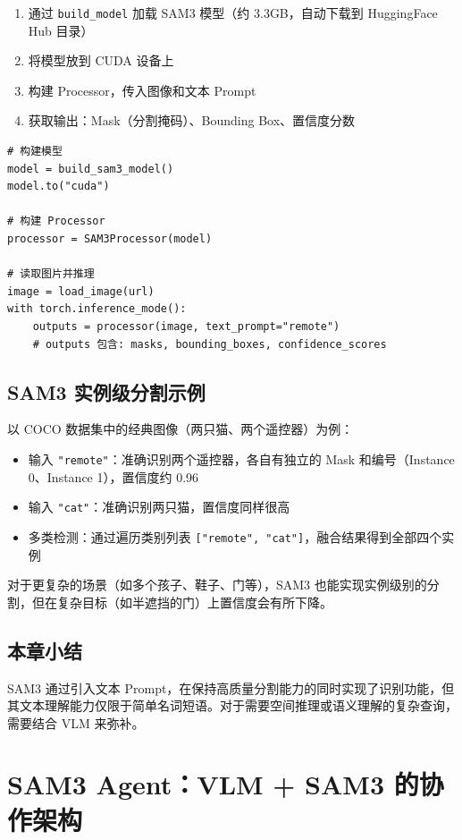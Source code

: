 \documentclass[a4paper]{article}
\begin{document}
\begin{enumerate}
    \item 通过 \texttt{build\_model} 加载 SAM3 模型（约 3.3GB，自动下载到 HuggingFace Hub 目录）
    \item 将模型放到 CUDA 设备上
    \item 构建 Processor，传入图像和文本 Prompt
    \item 获取输出：Mask（分割掩码）、Bounding Box、置信度分数
\end{enumerate}

\begin{lstlisting}[caption={SAM3 基本使用示例（伪代码）}]
# 构建模型
model = build_sam3_model()
model.to("cuda")

# 构建 Processor
processor = SAM3Processor(model)

# 读取图片并推理
image = load_image(url)
with torch.inference_mode():
    outputs = processor(image, text_prompt="remote")
    # outputs 包含: masks, bounding_boxes, confidence_scores
\end{lstlisting}

\subsection{SAM3 实例级分割示例}

以 COCO 数据集中的经典图像（两只猫、两个遥控器）为例：

\begin{itemize}
    \item 输入 \texttt{"remote"}：准确识别两个遥控器，各自有独立的 Mask 和编号（Instance 0、Instance 1），置信度约 0.96
    \item 输入 \texttt{"cat"}：准确识别两只猫，置信度同样很高
    \item 多类检测：通过遍历类别列表 \texttt{{[}"remote", "cat"{]}}，融合结果得到全部四个实例
\end{itemize}

对于更复杂的场景（如多个孩子、鞋子、门等），SAM3 也能实现实例级别的分割，但在复杂目标（如半遮挡的门）上置信度会有所下降。

\subsection{本章小结}

SAM3 通过引入文本 Prompt，在保持高质量分割能力的同时实现了识别功能，但其文本理解能力仅限于简单名词短语。对于需要空间推理或语义理解的复杂查询，需要结合 VLM 来弥补。


\section{SAM3 Agent：VLM + SAM3 的协作架构}
\end{document}
